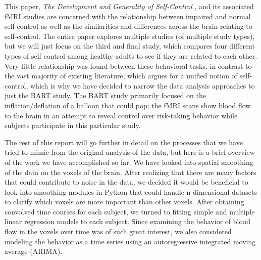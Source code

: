 \par This paper, \textit{The Development and Generality of Self-Control} \cite{CohenSelfControl},  and its associated fMRI studies are concerned with the relationship between impaired and normal self control as well as the similarities and differences across the brain relating to self-control. The entire paper explores multiple studies (of multiple study types), but we will just focus on the third and final study, which compares four different types of self control among healthy adults to see if they are related to each other. Very little relationship was found between these behavioral tasks, in contrast to the vast majority of existing literature, which argues for a unified notion of self-control, which is why we have decided to narrow the data analysis approaches to just the BART study. The BART study primarily focused on the inflation/deflation of a balloon that could pop; the fMRI scans show blood flow to the brain in an attempt to reveal control over risk-taking behavior while subjects participate in this particular study.
\par The rest of this report will go further in detail on the processes that we have tried to mimic from the original analysis of the data, but here is a brief overview of the work we have accomplished so far. We have looked into spatial smoothing of the data on the voxels of the brain. After realizing that there are many factors that could contribute to noise in the data, we decided it would be beneficial to look into smoothing modules in Python that could handle n-dimensional datasets to clarify which voxels are more important than other voxels. After obtaining convolved time courses for each subject, we turned to fitting simple and multiple linear regression models to each subject. Since examining the behavior of blood flow in the voxels over time was of such great interest, we also considered modeling the behavior as a time series using an autoregressive integrated moving average (ARIMA). 
